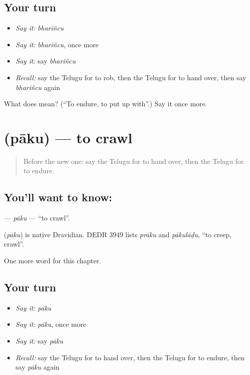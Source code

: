 \subsection*{Your turn}
\begin{itemize}
\raggedright
  \item \emph{Say it:} \emph{bhariñcu}
  \item \emph{Say it:} \emph{bhariñcu}, once more
  \item \emph{Say it:} say \emph{bhariñcu}
  \item \emph{Recall:} say the Telugu for to rob, then the Telugu for to hand over, then say \emph{bhariñcu} again
\end{itemize}

\begin{tcolorbox}[breakable,colback=teal!4,colframe=teal!35!black,title={Before you move on}]
What does  mean? (\textquotedblleft{}To endure, to put up with\textquotedblright{}.) Say it once more.
\end{tcolorbox}
\section[\texorpdfstring{\te{పాకు} (pāku)}{పాకు (pāku)}]{ (pāku) — to crawl}

\label{lesson:TE-C249-paku}



\begin{quote}
Before the new one: say the Telugu for to hand over, then the Telugu for to endure.
\end{quote}

\subsection*{You'll want to know: }
\textbf{} — \emph{pāku} — \textquotedblleft{}to crawl\textquotedblright{}.

\begin{cousinweb}
\textbf{} (\emph{pāku}) is native Dravidian. DEDR 3949 lists \emph{prāku} and \emph{pākulāḍu}, \textquotedblleft{}to creep, crawl\textquotedblright{}.
\end{cousinweb}

\begin{grammarlens}[title={What you've built}]
One more word for this chapter.
\end{grammarlens}

\subsection*{Your turn}
\begin{itemize}
\raggedright
  \item \emph{Say it:} \emph{pāku}
  \item \emph{Say it:} \emph{pāku}, once more
  \item \emph{Say it:} say \emph{pāku}
  \item \emph{Recall:} say the Telugu for to hand over, then the Telugu for to endure, then say \emph{pāku} again
\end{itemize}

